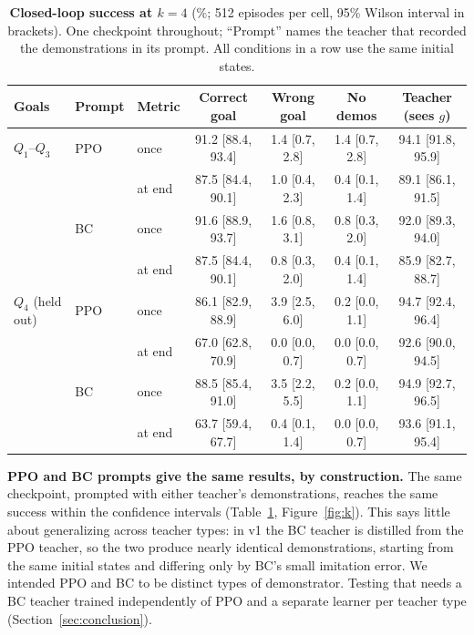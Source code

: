 \begin{table}[h]
\centering
\caption{\textbf{Closed-loop success at $k = 4$} (\%; 512 episodes per cell, 95\% Wilson interval in brackets). One checkpoint throughout;
``Prompt'' names the teacher that recorded the demonstrations in its prompt. All conditions in a row use the same initial states.}
\label{tab:main}
\small
\begin{tabular}{lllcccc}
\toprule
Goals & Prompt & Metric & Correct goal & Wrong goal & No demos & Teacher (sees $g$) \\
\midrule
$Q_1$--$Q_3$ & PPO & once   & 91.2 [88.4, 93.4] & 1.4 [0.7, 2.8] & 1.4 [0.7, 2.8] & 94.1 [91.8, 95.9] \\
             &     & at end & 87.5 [84.4, 90.1] & 1.0 [0.4, 2.3] & 0.4 [0.1, 1.4] & 89.1 [86.1, 91.5] \\
             & BC  & once   & 91.6 [88.9, 93.7] & 1.6 [0.8, 3.1] & 0.8 [0.3, 2.0] & 92.0 [89.3, 94.0] \\
             &     & at end & 87.5 [84.4, 90.1] & 0.8 [0.3, 2.0] & 0.4 [0.1, 1.4] & 85.9 [82.7, 88.7] \\
\midrule
$Q_4$ (held out) & PPO & once   & 86.1 [82.9, 88.9] & 3.9 [2.5, 6.0] & 0.2 [0.0, 1.1] & 94.7 [92.4, 96.4] \\
                 &     & at end & 67.0 [62.8, 70.9] & 0.0 [0.0, 0.7] & 0.0 [0.0, 0.7] & 92.6 [90.0, 94.5] \\
                 & BC  & once   & 88.5 [85.4, 91.0] & 3.5 [2.2, 5.5] & 0.2 [0.0, 1.1] & 94.9 [92.7, 96.5] \\
                 &     & at end & 63.7 [59.4, 67.7] & 0.4 [0.1, 1.4] & 0.0 [0.0, 0.7] & 93.6 [91.1, 95.4] \\
\bottomrule
\end{tabular}
\end{table}

\textbf{PPO and BC prompts give the same results, by construction.} The same checkpoint, prompted with either teacher's
demonstrations, reaches the same success within the confidence intervals (Table~\ref{tab:main}, Figure~\ref{fig:k}). This says
little about generalizing across teacher types: in v1 the BC teacher is distilled from the PPO teacher, so the two produce nearly
identical demonstrations, starting from the same initial states and differing only by BC's small imitation error. We
intended PPO and BC to be distinct types of demonstrator. Testing that needs a BC teacher trained independently of PPO and a separate
learner per teacher type (Section~\ref{sec:conclusion}).

